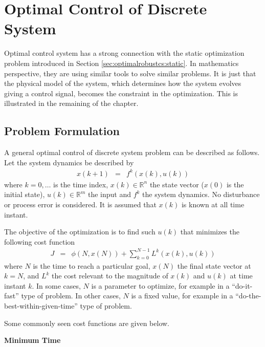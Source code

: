 \section{Optimal Control of Discrete System} \label{sec:optimalrobustcs:discrete}

Optimal control system has a strong connection with the static optimization problem introduced in Section \ref{sec:optimalrobustcs:static}. In mathematics perspective, they are using similar tools to solve similar problems. It is just that the physical model of the system, which determines how the system evolves giving a control signal, becomes the constraint in the optimization. This is illustrated in the remaining of the chapter.

\subsection{Problem Formulation}

A general optimal control of discrete system problem can be described as follows. Let the system dynamics be described by
\begin{eqnarray}
  x(k+1) &=& f^k\left(x(k), u(k)\right) \label{eq:optimalrobustcs:generaldynamic}
\end{eqnarray}
where $k=0,\ldots$ is the time index, $x(k)\in\mathbb{R}^n$ the state vector ($x(0)$ is the initial state), $u(k)\in\mathbb{R}^m$ the input and $f^k$ the system dynamics. No disturbance or process error is considered. It is assumed that $x(k)$ is known at all time instant.

The objective of the optimization is to find such $u(k)$ that minimizes the following cost function
\begin{eqnarray}
  J &=& \phi\left(N, x(N)\right) + \sum_{k=0}^{N-1}L^k\left(x(k), u(k)\right) \label{eq:optimalrobustcs:generaldiscrete}
\end{eqnarray}
where $N$ is the time to reach a particular goal, $x(N)$ the final state vector at $k=N$, and $L^k$ the cost relevant to the magnitude of $x(k)$ and $u(k)$ at time instant $k$. In some cases, $N$ is a parameter to optimize, for example in a ``do-it-fast'' type of problem. In other cases, $N$ is a fixed value, for example in a ``do-the-best-within-given-time'' type of problem.

Some commonly seen cost functions are given below.

\vspace{0.1in}
\noindent \textbf{Minimum Time}
\vspace{0.1in}

